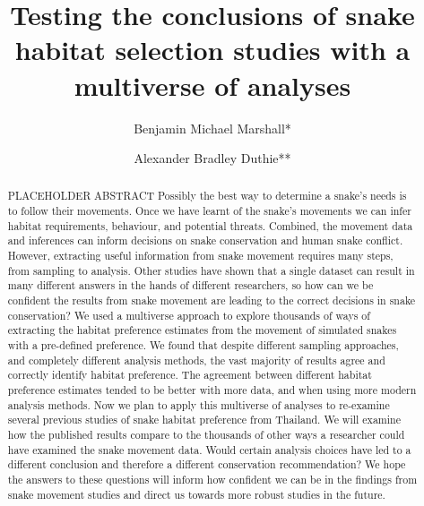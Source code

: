 \documentclass[10pt,a4paper]{article}
\begin{document}
\pagestyle{fancy}

\title{Testing the conclusions of snake habitat selection studies with a multiverse of analyses}
\author[1]{Benjamin Michael Marshall*}
\author[1]{Alexander Bradley Duthie**}


\maketitle
\thispagestyle{fancy}

\begin{abstract}

PLACEHOLDER ABSTRACT Possibly the best way to determine a snake's needs is to follow their movements. Once we have learnt of the snake's movements we can infer habitat requirements, behaviour, and potential threats. Combined, the movement data and inferences can inform decisions on snake conservation and human snake conflict. However, extracting useful information from snake movement requires many steps, from sampling to analysis. Other studies have shown that a single dataset can result in many different answers in the hands of different researchers, so how can we be confident the results from snake movement are leading to the correct decisions in snake conservation? We used a multiverse approach to explore thousands of ways of extracting the habitat preference estimates from the movement of simulated snakes with a pre-defined preference. We found that despite different sampling approaches, and completely different analysis methods, the vast majority of results agree and correctly identify habitat preference. The agreement between different habitat preference estimates tended to be better with more data, and when using more modern analysis methods. Now we plan to apply this multiverse of analyses to re-examine several previous studies of snake habitat preference from Thailand. We will examine how the published results compare to the thousands of other ways a researcher could have examined the snake movement data. Would certain analysis choices have led to a different conclusion and therefore a different conservation recommendation? We hope the answers to these questions will inform how confident we can be in the findings from snake movement studies and direct us towards more robust studies in the future.

\end{abstract}
\end{document}

